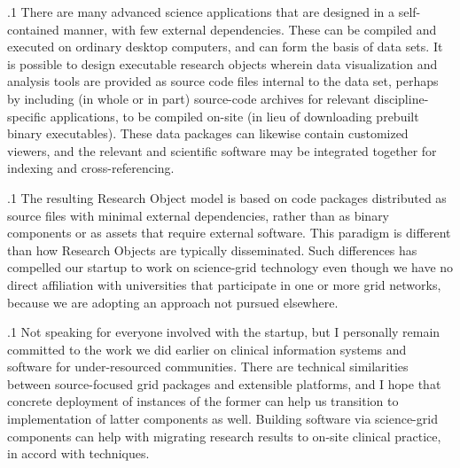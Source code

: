 \documentclass[11pt, twoside]{article}
\begin{document}
{\p.1{%
There are many advanced science applications that
are designed in a self-contained manner, with
few external dependencies. These can be compiled
and executed on ordinary desktop computers, and
can form the basis of  data sets.
It is possible to design executable research objects
wherein data visualization and analysis tools are
provided as source code files internal to the
data set, perhaps by including (in whole or in part)
source-code archives for relevant discipline-specific
applications, to be compiled on-site (in lieu of
downloading prebuilt binary executables). These
data packages can likewise contain customized
 viewers, and the relevant  and scientific software
may be integrated together for indexing and cross-referencing.
}%

\p.1{%
The resulting Research Object model is based on
code packages distributed as source files with
minimal external dependencies, rather than as binary
components or as assets that require external
software. This paradigm is different than
how Research Objects are typically disseminated.
Such differences has compelled our startup to
work on science-grid technology even though we
have no direct affiliation with universities
that participate in one or more grid networks,
because we are adopting an approach not pursued elsewhere.
}%

\p.1{%
Not speaking for everyone involved with the startup,
but I personally remain committed to the work we did
earlier on clinical information systems and
 software for under-resourced communities. There
are technical similarities between source-focused
grid packages and extensible  platforms, and
I hope that concrete deployment of instances of the
former can help us transition to implementation
of latter components as well. Building
 software via science-grid components can help
with migrating research results to on-site
clinical practice, in accord with 
techniques.\enlargethispage{1em}
}%





}
\end{document}
